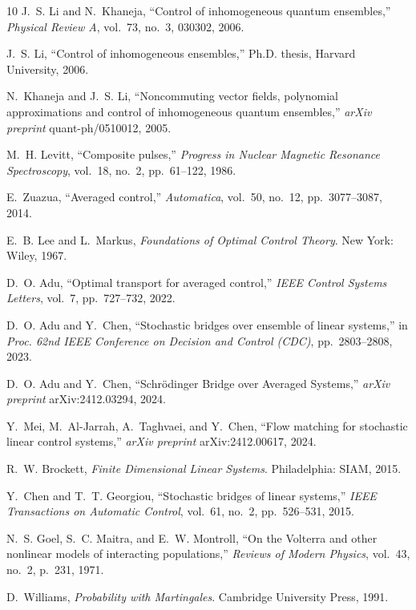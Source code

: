 \documentclass[12pt]{amsart}
\renewcommand{\(}{\left (}
\renewcommand{\)}{\right )}
\numberwithin{equation}{section}
\begin{document}
\begin{thebibliography}{10}
J.~S. Li and N.~Khaneja,
``Control of inhomogeneous quantum ensembles,''
\emph{Physical Review A}, vol.~73, no.~3, 030302, 2006.

J.~S. Li,
``Control of inhomogeneous ensembles,''
Ph.D. thesis, Harvard University, 2006.

N.~Khaneja and J.~S. Li,
``Noncommuting vector fields, polynomial approximations and control of inhomogeneous quantum ensembles,''
\emph{arXiv preprint} quant-ph/0510012, 2005.

M.~H. Levitt,
``Composite pulses,''
\emph{Progress in Nuclear Magnetic Resonance Spectroscopy}, vol.~18, no.~2, pp.~61--122, 1986.

E.~Zuazua,
``Averaged control,''
\emph{Automatica}, vol.~50, no.~12, pp.~3077--3087, 2014.

E.~B. Lee and L.~Markus,
\emph{Foundations of Optimal Control Theory}.
New York: Wiley, 1967.

D.~O. Adu,
``Optimal transport for averaged control,''
\emph{IEEE Control Systems Letters}, vol.~7, pp.~727--732, 2022.

D.~O. Adu and Y.~Chen,
``Stochastic bridges over ensemble of linear systems,''
in \emph{Proc. 62nd IEEE Conference on Decision and Control (CDC)}, pp.~2803--2808, 2023.

D.~O. Adu and Y.~Chen,
``Schr\"{o}dinger Bridge over Averaged Systems,''
\emph{arXiv preprint} arXiv:2412.03294, 2024.

Y.~Mei, M.~Al-Jarrah, A.~Taghvaei, and Y.~Chen,
``Flow matching for stochastic linear control systems,''
\emph{arXiv preprint} arXiv:2412.00617, 2024.

R.~W. Brockett,
\emph{Finite Dimensional Linear Systems}.
Philadelphia: SIAM, 2015.

Y.~Chen and T.~T. Georgiou,
``Stochastic bridges of linear systems,''
\emph{IEEE Transactions on Automatic Control}, vol.~61, no.~2, pp.~526--531, 2015.

N.~S. Goel, S.~C. Maitra, and E.~W. Montroll,
``On the Volterra and other nonlinear models of interacting populations,''
\emph{Reviews of Modern Physics}, vol.~43, no.~2, p.~231, 1971.

D.~Williams,
\emph{Probability with Martingales}.
Cambridge University Press, 1991.


\end{thebibliography}
\end{document}
